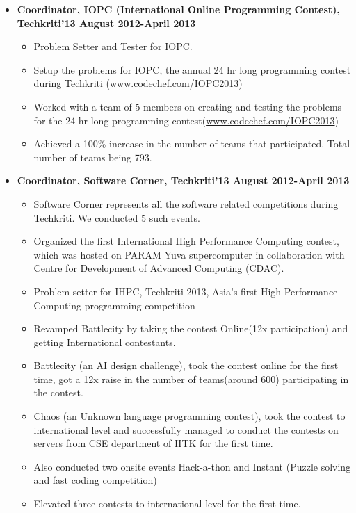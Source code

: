 \documentclass[margin,line]{resume}
\begin{document}
\begin{resume}
\begin{itemize}
  \item  \textbf{\textsf{Coordinator, IOPC (International Online Programming Contest), Techkriti'13 August 2012-April 2013}}
    \begin{itemize}
    \item Problem Setter and Tester for IOPC.
    \item Setup the problems for IOPC, the annual 24 hr long programming contest during Techkriti (\url{www.codechef.com/IOPC2013})
    \item Worked with a team of 5 members on creating and testing the problems for the 24 hr long programming contest(\url{www.codechef.com/IOPC2013})
    \item Achieved a 100\% increase in the number of teams that participated. Total number of teams being 793.
    \end{itemize}
    
  \item  \textbf{\textsf Coordinator, Software Corner, Techkriti'13 August 2012-April 2013}
    \begin{itemize}
    \item Software Corner represents all the software related competitions during Techkriti. We conducted 5 such events.
    \item Organized the first International High Performance Computing contest, which was hosted on PARAM Yuva supercomputer in collaboration with Centre for Development of Advanced Computing (CDAC). 
    \item Problem setter for IHPC, Techkriti 2013, Asia’s first High Performance Computing programming competition
    \item Revamped Battlecity by taking the contest Online(12x participation) and getting International contestants.
    \item  Battlecity (an AI design challenge), took the contest online for the first time, got a 12x raise in the number of teams(around 600) participating in the contest.
    \item Chaos (an Unknown language programming contest), took the contest to international level and successfully managed to conduct the contests on servers from CSE department of IITK for the first time.
    \item Also conducted two onsite events Hack-a-thon and Instant (Puzzle solving and fast coding competition)
    \item Elevated three contests to international level for the first time.
    \end{itemize}


\end{itemize}
\end{resume}
\end{document}
